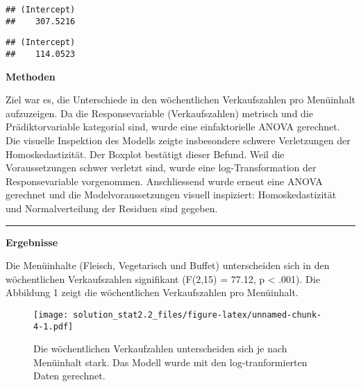 \documentclass[]{article}
\newenvironment{Shaded}{\begin{snugshade}}{\end{snugshade}}
\newcommand{\CommentTok}[1]{\textcolor[rgb]{0.56,0.35,0.01}{\textit{#1}}}
\newcommand{\DecValTok}[1]{\textcolor[rgb]{0.00,0.00,0.81}{#1}}
\newcommand{\NormalTok}[1]{#1}
\newcommand{\OperatorTok}[1]{\textcolor[rgb]{0.81,0.36,0.00}{\textbf{#1}}}
\newcommand{\StringTok}[1]{\textcolor[rgb]{0.31,0.60,0.02}{#1}}
\begin{document}
\begin{verbatim}
## (Intercept) 
##    307.5216
\end{verbatim}

\begin{Shaded}
\end{Shaded}

\begin{verbatim}
## (Intercept) 
##    114.0523
\end{verbatim}

\textbf{Methoden}

Ziel war es, die Unterschiede in den wöchentlichen Verkaufszahlen pro
Menüinhalt aufzuzeigen. Da die Responsevariable (Verkaufszahlen)
metrisch und die Prädiktorvariable kategorial sind, wurde eine
einfaktorielle ANOVA gerechnet. Die visuelle Inspektion des Modells
zeigte insbesondere schwere Verletzungen der Homoskedastizität. Der
Boxplot bestätigt dieser Befund. Weil die Voraussetzungen schwer
verletzt sind, wurde eine log-Transformation der Responsevariable
vorgenommen. Anschliessend wurde erneut eine ANOVA gerechnet und die
Modelvoraussetzungen visuell inspiziert: Homoskedastizität und
Normalverteilung der Residuen sind gegeben.

\begin{center}\rule{0.5\linewidth}{\linethickness}\end{center}

\textbf{Ergebnisse}

Die Menüinhalte (Fleisch, Vegetarisch und Buffet) unterscheiden sich in
den wöchentlichen Verkaufszahlen signifikant (F(2,15) = 77.12, p
\textless{} .001). Die Abbildung 1 zeigt die wöchentlichen
Verkaufszahlen pro Menüinhalt.

\begin{figure}
\centering
\texttt{[image: solution\_stat2.2\_files/figure-latex/unnamed-chunk-4-1.pdf]}
\caption{Die wöchentlichen Verkaufzahlen unterscheiden sich je nach
Menüinhalt stark. Das Modell wurde mit den log-tranformierten Daten
gerechnet.}
\end{figure}
\end{document}
